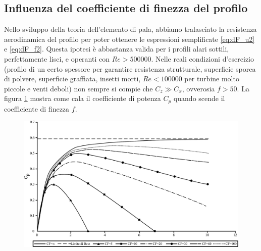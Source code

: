 \subsection{Influenza del coefficiente di finezza del profilo}
Nello sviluppo della teoria dell'elemento di pala, abbiamo tralasciato la resistenza aerodinamica del profilo per poter ottenere le espressioni semplificate \ref{eq:dF_u2} e \ref{eq:dF_f2}. Questa ipotesi è abbastanza valida per i profili alari sottili, perfettamente lisci, e operanti con $Re > 500000$. Nelle reali condizioni d'esercizio (profilo di un certo spessore per garantire resistenza strutturale, superficie sporca di polvere, superficie graffiata, insetti morti, $Re < 100000$ per turbine molto piccole e venti deboli) non sempre si compie che $C_z \gg C_x$, ovverosia $f > 50$. La figura \ref{fig:cplambda} mostra come cala il coefficiente di potenza $C_p$ quando scende il coefficiente di finezza $f$. 
\begin{figure}[h!]
\centering
  \includegraphics[width=.9\textwidth]{fig/cplambda.pdf}
\caption{}
\label{fig:cplambda}
\end{figure}

